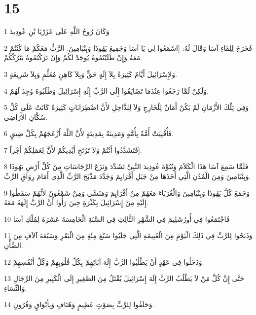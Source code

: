 \chapter{15}

\par 1 وَكَانَ رُوحُ اللَّهِ عَلَى عَزَرْيَا بْنِ عُودِيدَ
\par 2 فَخَرَجَ لِلِقَاءِ آسَا وَقَالَ لَهُ: [اسْمَعُوا لِي يَا آسَا وَجَمِيعَ يَهُوذَا وَبِنْيَامِينَ. الرَّبُّ مَعَكُمْ مَا كُنْتُمْ مَعَهُ وَإِنْ طَلَبْتُمُوهُ يُوجَدْ لَكُمْ وَإِنْ تَرَكْتُمُوهُ يَتْرُكْكُمْ.
\par 3 وَلإِسْرَائِيلَ أَيَّامٌ كَثِيرَةٌ بِلاَ إِلَهٍ حَقٍّ وَبِلاَ كَاهِنٍ مُعَلِّمٍ وَبِلاَ شَرِيعَةٍ.
\par 4 وَلَكِنْ لَمَّا رَجَعُوا عِنْدَمَا تَضَايَقُوا إِلَى الرَّبِّ إِلَهِ إِسْرَائِيلَ وَطَلَبُوهُ وُجِدَ لَهُمْ.
\par 5 وَفِي تِلْكَ الأَزْمَانِ لَمْ يَكُنْ أَمَانٌ لِلْخَارِجِ وَلاَ لِلدَّاخِلِ لأَنَّ اضْطِرَابَاتٍ كَثِيرَةً كَانَتْ عَلَى كُلِّ سُكَّانِ الأَرَاضِي.
\par 6 فَأُفْنِيَتْ أُمَّةٌ بِأُمَّةٍ وَمَدِينَةٌ بِمَدِينَةٍ لأَنَّ اللَّهَ أَزْعَجَهُمْ بِكُلِّ ضِيقٍ.
\par 7 فَتَشَدَّدُوا أَنْتُمْ وَلاَ تَرْتَخِ أَيْدِيكُمْ لأَنَّ لِعَمَلِكُمْ أَجْراً].
\par 8 فَلَمَّا سَمِعَ آسَا هَذَا الْكَلاَمَ وَنُبُوَّةَ عُودِيدَ النَّبِيِّ تَشَدَّدَ وَنَزَعَ الرَّجَاسَاتِ مِنْ كُلِّ أَرْضِ يَهُوذَا وَبِنْيَامِينَ وَمِنَ الْمُدُنِ الَّتِي أَخَذَهَا مِنْ جَبَلِ أَفْرَايِمَ وَجَدَّدَ مَذْبَحَ الرَّبِّ الَّذِي أَمَامَ رِوَاقِ الرَّبِّ.
\par 9 وَجَمَعَ كُلَّ يَهُوذَا وَبِنْيَامِينَ وَالْغُرَبَاءَ مَعَهُمْ مِنْ أَفْرَايِمَ وَمَنَسَّى وَمِنْ شَمْعُونَ لأَنَّهُمْ سَقَطُوا إِلَيْهِ مِنْ إِسْرَائِيلَ بِكَثْرَةٍ حِينَ رَأُوا أَنَّ الرَّبَّ إِلَهَهُ مَعَهُ.
\par 10 فَاجْتَمَعُوا فِي أُورُشَلِيمَ فِي الشَّهْرِ الثَّالِثِ فِي السَّنَةِ الْخَامِسَةَ عَشَرَةَ لِمُلْكِ آسَا
\par 11 وَذَبَحُوا لِلرَّبِّ فِي ذَلِكَ الْيَوْمِ مِنَ الْغَنِيمَةِ الَّتِي جَلَبُوا سَبْعَ مِئَةٍ مِنَ الْبَقَرِ وَسَبْعَةَ آلاَفٍ مِنَ الضَّأْنِ.
\par 12 وَدَخَلُوا فِي عَهْدٍ أَنْ يَطْلُبُوا الرَّبَّ إِلَهَ آبَائِهِمْ بِكُلِّ قُلُوبِهِمْ وَكُلِّ أَنْفُسِهِمْ.
\par 13 حَتَّى إِنَّ كُلَّ مَنْ لاَ يَطْلُبُ الرَّبَّ إِلَهَ إِسْرَائِيلَ يُقْتَلُ مِنَ الصَّغِيرِ إِلَى الْكَبِيرِ مِنَ الرِّجَالِ وَالنِّسَاءِ.
\par 14 وَحَلَفُوا لِلرَّبِّ بِصَوْتٍ عَظِيمٍ وَهُتَافٍ وَبِأَبْوَاقٍ وَقُرُونٍ.
